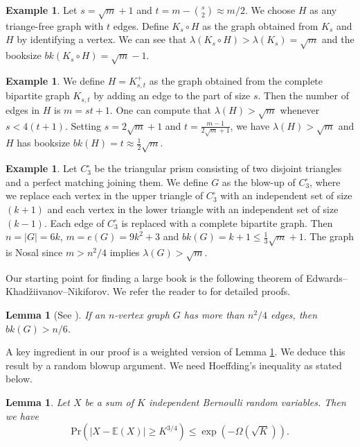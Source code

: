\documentclass[11pt,a4paper]{article}
\newtheorem{lemma}[theorem]{Lemma}
\theoremstyle{definition}
\newtheorem{example}[theorem]{Example}
\theoremstyle{remark}
\begin{document}
\begin{example}\label{exam-booook}
Let $ s = \sqrt{m} +1$ and $t=m- {s \choose 2} \approx m/2$. 
We choose $H$ as any triange-free graph with 
$t$ edges. Define $K_s\circ H$ as the graph obtained 
from $K_s$ and $H$ by identifying a vertex. We can see that $\lambda(K_s \circ H) > \lambda (K_s) = \sqrt{m}$ 
and the booksize $bk(K_s\circ H)= \sqrt{m} -1$. 
\end{example}


\begin{example} \label{exam-KST}
We define $H=K_{s,t}^+$ as the graph obtained from 
the complete bipartite graph $K_{s,t}$ by adding an edge to the part of size $s$. Then the number of edges in $H$ is $m=st+1$. 
One can compute 
that $\lambda (H) > \sqrt{m}$ whenever $s< 4(t+1)$. 
Setting $s=2\sqrt{m}+1$ and $t=\frac{m-1}{2\sqrt{m}+1}$, 
we have $\lambda (H) > \sqrt{m}$ and $H$ has booksize $bk(H) = t \approx \frac{1}{2}\sqrt{m}$.
\end{example}

\begin{example} \label{exam-prism}
Let $C_3^{\square}$ be the triangular prism consisting of two disjoint triangles and a perfect matching joining them.  
We define $G$ as
 the blow-up of $C_3^{\square}$, where we 
replace each vertex in the upper triangle of $C_3^{\square}$ with an independent set of size $(k + 1)$ and each vertex in the lower triangle with an independent set of size $(k - 1)$. Each edge of $C_3^{\square}$ is replaced with a complete bipartite graph. 
Then $n=|G|=6k$, $m=e(G)=9k^2+3$ and $bk(G)=k+1 \leq \frac{1}{3} \sqrt{m} + 1$. The graph is Nosal since $m > n^2 / 4$ implies $\lambda (G)> \sqrt{m}$.
\end{example}

Our starting point for finding a large book is the following theorem of Edwards--Khad\v{z}iivanov--Nikiforov. 
We refer the reader to \cite{EFR1992,BN2005,LFP2024-triangular} for detailed proofs. 

\begin{lemma}[See \cite{KN1979}] \label{lem-Edw}
    If an $n$-vertex graph $G$ has more than $n^2 / 4$ edges, 
    then $bk(G) > {n}/{6}$.
\end{lemma}

A key ingredient in our proof is a weighted version of Lemma \ref{lem-Edw}. We deduce this result by a random blowup argument. We need Hoeffding's inequality as stated below.

\begin{lemma} \label{lem:Cher}
    Let $X$ be a sum of $K$ independent Bernoulli random variables. Then we have
   $$\mathrm{Pr} \left(|X-\mathbb{E}(X)| \ge K^{3/4} \right) \leq \exp\left(-\Omega(\sqrt{K}) \right).$$
\end{lemma}
\end{document}
